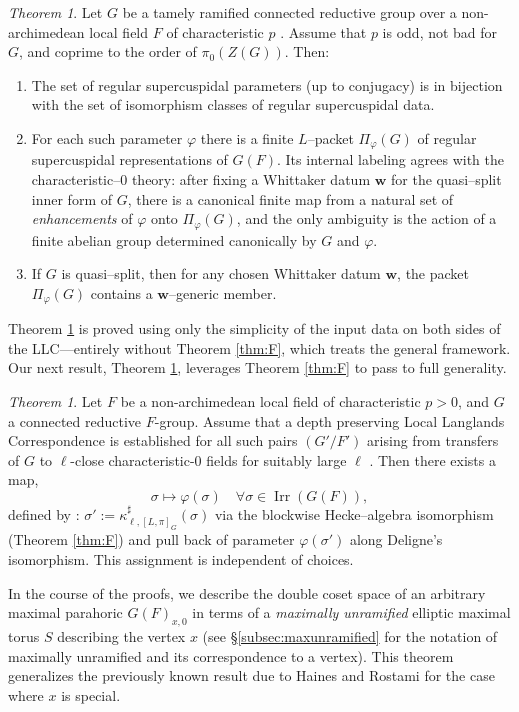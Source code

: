 \documentclass[american]{article}
\numberwithin{equation}{section}
\numberwithin{figure}{section}
\theoremstyle{plain}
\theoremstyle{definition}
\theoremstyle{remark}
\newcounter{thmA}
\newtheorem{theoremA}[thmA]{Theorem}
\begin{document}
\begin{theoremA}\label{thm:G}
Let  \(G\) be a tamely ramified connected reductive group over a non-archimedean local field \(F\) of characteristic \(p\) . Assume that  \(p\) is odd, not bad for \(G\), and coprime to the order of \(\pi_0(Z(G))\). Then:  
\begin{enumerate}
\item The set of regular supercuspidal parameters (up to conjugacy) is in bijection with the set of isomorphism classes of regular supercuspidal data.  
\item For each such parameter $\varphi$ there is a finite $L$--packet $\Pi_\varphi(G)$ of regular supercuspidal representations of $G(F)$. Its internal labeling agrees with the characteristic--$0$ theory: after fixing a Whittaker datum \(\mathbf{w}\) for the quasi--split inner form of $G$, there is a canonical finite map from a natural set of \emph{enhancements} of $\varphi$ onto
$\Pi_\varphi(G)$, and the only ambiguity is the action of a finite abelian group determined canonically by $G$ and $\varphi$.
\item If $G$ is quasi--split, then for any chosen Whittaker datum $\mathbf{w}$, the packet
$\Pi_\varphi(G)$ contains a $\mathbf{w}$--generic member.
\end{enumerate}  
\end{theoremA}
Theorem \ref{thm:G} is proved using only the simplicity of the input data on both sides of the LLC---entirely without Theorem \ref{thm:F}, which treats the general framework. Our next result, Theorem \ref{thm:H}, leverages Theorem \ref{thm:F} to pass to full generality.
\begin{theoremA}\label{thm:H}
Let \(F\) be a non-archimedean local field of characteristic \(p > 0\), and \(G\) a connected reductive \(F\)-group. Assume that a depth preserving Local Langlands Correspondence is established for all such pairs \((G'/F')\) arising from transfers of \(G\) to \(\ell\)-close characteristic-\(0\) fields for suitably large \(\ell\) . Then there exists a map, 
\[
\sigma \mapsto \varphi(\sigma) \quad \forall \sigma \in \operatorname{Irr}(G(F)),
\]defined by :  \(\sigma':=\kappa_{\ell,[L,\pi]_G}^{\sharp}(\sigma)\) via the blockwise Hecke--algebra isomorphism (Theorem \ref{thm:F}) and pull back of parameter  \(\varphi(\sigma')\) along Deligne's isomorphism. This assignment is independent of choices. 
\end{theoremA}
In the course of the proofs, we describe the double coset space of an arbitrary maximal parahoric \(G(F)_{x,0}\) in terms of a \emph{maximally unramified} elliptic maximal torus \(S\) describing the vertex \(x\) (see \S \ref{subsec:maxunramified} for the notation of maximally unramified and its correspondence to a vertex). This theorem generalizes the previously known result due to Haines and Rostami \cite{HR10} for the case where \(x\) is special. 
\end{document}
